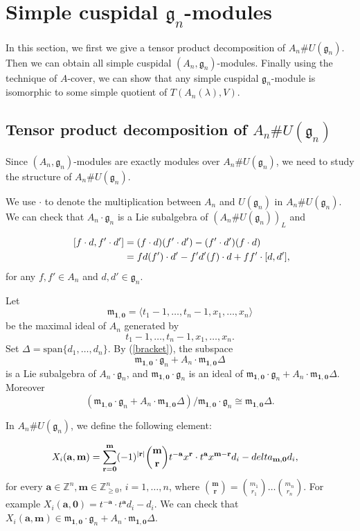 \documentclass[12pt,a4paper]{amsart}
\def\mg{g}%
\def\delta{delta}%
\numberwithin{equation}{section}
\newcommand{\Z}{\mathbb{Z}}
\def\mg{\mathfrak{g}}
\def\mm{\mathfrak{m}}
\def\ba{\mathbf{a}}
\def\br{\mathbf{r}}
\def\bm{\mathbf{m}}
\def\b1{\mathbf{1}}
\def\bo{\mathbf{0}}
\begin{document}
\section{Simple cuspidal $\mg_n$-modules}

In this section, we first we give a
tensor product decomposition of   $A_n\# U(\mg_n)$. Then we can obtain all
simple cuspidal $(A_n,\mg_n)$-modules. Finally using the technique of  $A$-cover,
we can show that any simple cuspidal $\mg_n$-module is isomorphic to
some simple quotient of  $T(A_n(\lambda), V)$.

 \subsection{Tensor product decomposition of   $A_n\# U(\mg_n)$}
Since $(A_n,\mg_n)$-modules are exactly modules over
 $A_n\# U(\mg_n)$,
we need to study the structure of
 $A_n\# U(\mg_n)$.



 We use $\cdot$ to denote the multiplication between $A_n$ and $U(\mg_n)$ in $A_n\# U(\mg_n)$. We can check that
 $A_n\cdot \mg_n$ is a Lie subalgebra of $(A_n\# U(\mg_n))_L$ and

\begin{equation}\label{bracket}
 \aligned \
 [f\cdot d, f'\cdot d']&=(f\cdot d)( f'\cdot d')-(f'\cdot d')( f\cdot d)\\
 &=fd(f')\cdot d'-f'd'(f)\cdot d+ff'\cdot [d,d'],
 \endaligned
\end{equation}
for any \(f,f'\in A_n\) and \(d,d'\in\mg_n\).

Let
\[\mm_{\b1,\bo}=\langle t_1-1,\dots,t_n-1,x_1,\dots,x_n\rangle\]
be the maximal ideal of \(A_n\) generated by
\[t_1-1,\dots,t_n-1,x_1,\dots,x_n.\]
Set $\Delta=\mathrm{span}\{d_1,\dots,d_n\}$.
By (\ref{bracket}), the subspace $$\mm_{\b1,\bo}\cdot \mg_n+A_n\cdot \mm_{\b1,\bo}\Delta$$
is a Lie subalgebra of   $A_n\cdot \mg_n$, and $\mm_{\b1,\bo}\cdot \mg_n$
is an ideal of
$\mm_{\b1,\bo}\cdot \mg_n+A_n\cdot \mm_{\b1,\bo}\Delta$. Moreover
\begin{equation}
\label{factor} (\mm_{\b1,\bo}\cdot \mg_n+A_n\cdot \mm_{\b1,\bo}\Delta)/\mm_{\b1,\bo}\cdot \mg_n\cong  \mm_{\b1,\bo}\Delta.
\end{equation}


In $A_n\# U(\mg_n)$,
we
define the following element:

\begin{equation}\label{eq:reconstruction}\aligned
 X_i(\ba,\bm)&=\sum_{\br=\bo}^{\bm} (-1)^{|\br|}\binom{\bm}{\br}t^{-\ba}x^{\br}\cdot t^{\ba}x^{\bm-\br}d_{i}
 -\delta_{\bm,\bo}d_i,
 \endaligned\end{equation}
for every $\ba\in \Z^n, \bm\in\Z_{\geq 0}^n$, $i=1,\dots,n$, where
 $\binom{\bm}{\br}=\binom{m_1}{r_1}\dots\binom{m_n}{r_n}$.
For example $ X_i(\ba,\bo)=t^{-\ba}\cdot t^{\ba}d_{i}-d_i$.
We can check that $X_i(\ba,\bm)\in \mm_{\b1,\bo}\cdot \mg_n+A_n\cdot \mm_{\b1,\bo}\Delta$.
\end{document}
